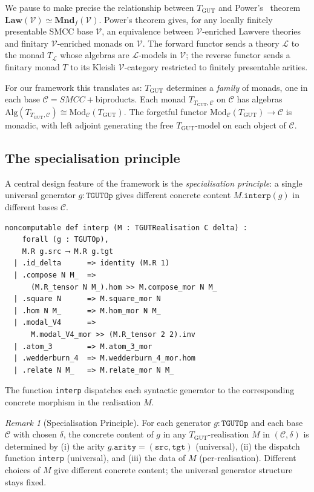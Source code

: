 \documentclass[11pt,a4paper]{article}
\theoremstyle{plain}
\theoremstyle{definition}
\theoremstyle{remark}
\newtheorem{remark}[theorem]{Remark}
\newcommand{\cat}[1]{\mathbf{#1}}
\newcommand{\Mod}{\mathrm{Mod}}
\newcommand{\TGUT}{T_{\mathrm{GUT}}}
\newcommand{\smcc}{SMCC}
\begin{document}
We pause to make precise the relationship between $\TGUT$ and Power's~\cite{Pow99} theorem $\cat{Law}(\mathcal{V}) \simeq \cat{Mnd}_f(\mathcal{V})$. Power's theorem gives, for any locally finitely presentable \smcc{} base $\mathcal{V}$, an equivalence between $\mathcal{V}$-enriched Lawvere theories and finitary $\mathcal{V}$-enriched monads on $\mathcal{V}$. The forward functor sends a theory $\mathcal{L}$ to the monad $T_{\mathcal{L}}$ whose algebras are $\mathcal{L}$-models in $\mathcal{V}$; the reverse functor sends a finitary monad $T$ to its Kleisli $\mathcal{V}$-category restricted to finitely presentable arities.

For our framework this translates as: $\TGUT$ determines a \emph{family} of monads, one in each base $\mathcal{C} = \smcc + \text{biproducts}$. Each monad $T_{\TGUT, \mathcal{C}}$ on $\mathcal{C}$ has algebras $\mathrm{Alg}(T_{\TGUT, \mathcal{C}}) \cong \Mod_{\mathcal{C}}(\TGUT)$. The forgetful functor $\Mod_{\mathcal{C}}(\TGUT) \to \mathcal{C}$ is monadic, with left adjoint generating the free $\TGUT$-model on each object of $\mathcal{C}$.

\subsection{The specialisation principle}\label{sec:tgut:spec}

A central design feature of the framework is the \emph{specialisation principle}: a single universal generator $g : \mathtt{TGUTOp}$ gives different concrete content $M.\mathtt{interp}(g)$ in different bases $\mathcal{C}$.

\begin{lstlisting}[language=Lean]
noncomputable def interp (M : TGUTRealisation C delta) :
    forall (g : TGUTOp),
    M.R g.src ⟶ M.R g.tgt
  | .id_delta      => identity (M.R 1)
  | .compose N M_  =>
      (M.R_tensor N M_).hom >> M.compose_mor N M_
  | .square N      => M.square_mor N
  | .hom N M_      => M.hom_mor N M_
  | .modal_V4      =>
      M.modal_V4_mor >> (M.R_tensor 2 2).inv
  | .atom_3        => M.atom_3_mor
  | .wedderburn_4  => M.wedderburn_4_mor.hom
  | .relate N M_   => M.relate_mor N M_
\end{lstlisting}

The function \texttt{interp} dispatches each syntactic generator to the corresponding concrete morphism in the realisation $M$.

\begin{remark}[Specialisation Principle]\label{rem:spec}
For each generator $g : \mathtt{TGUTOp}$ and each base $\mathcal{C}$ with chosen $\delta$, the concrete content of $g$ in any $\TGUT$-realisation $M$ in $(\mathcal{C}, \delta)$ is determined by (i) the arity $g.\mathtt{arity} = (\mathtt{src}, \mathtt{tgt})$ (universal), (ii) the dispatch function \texttt{interp} (universal), and (iii) the data of $M$ (per-realisation). Different choices of $M$ give different concrete content; the universal generator structure stays fixed.
\end{remark}
\end{document}
